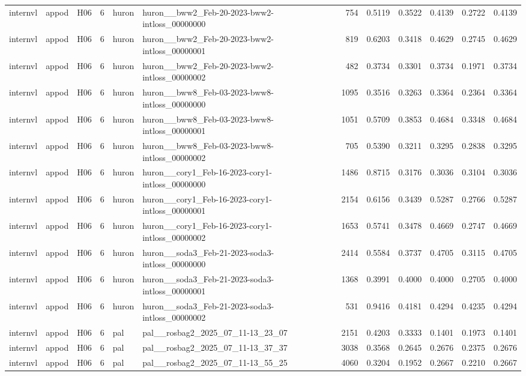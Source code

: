 \begin{table}[tbp]
\begin{tabular}{lllrllrrrrrr}
internvl & appod & H06 & 6 & huron & huron\_\_bww2\_Feb-20-2023-bww2-intloss\_00000000 & 754 & 0.5119 & 0.3522 & 0.4139 & 0.2722 & 0.4139 \\
internvl & appod & H06 & 6 & huron & huron\_\_bww2\_Feb-20-2023-bww2-intloss\_00000001 & 819 & 0.6203 & 0.3418 & 0.4629 & 0.2745 & 0.4629 \\
internvl & appod & H06 & 6 & huron & huron\_\_bww2\_Feb-20-2023-bww2-intloss\_00000002 & 482 & 0.3734 & 0.3301 & 0.3734 & 0.1971 & 0.3734 \\
internvl & appod & H06 & 6 & huron & huron\_\_bww8\_Feb-03-2023-bww8-intloss\_00000000 & 1095 & 0.3516 & 0.3263 & 0.3364 & 0.2364 & 0.3364 \\
internvl & appod & H06 & 6 & huron & huron\_\_bww8\_Feb-03-2023-bww8-intloss\_00000001 & 1051 & 0.5709 & 0.3853 & 0.4684 & 0.3348 & 0.4684 \\
internvl & appod & H06 & 6 & huron & huron\_\_bww8\_Feb-03-2023-bww8-intloss\_00000002 & 705 & 0.5390 & 0.3211 & 0.3295 & 0.2838 & 0.3295 \\
internvl & appod & H06 & 6 & huron & huron\_\_cory1\_Feb-16-2023-cory1-intloss\_00000000 & 1486 & 0.8715 & 0.3176 & 0.3036 & 0.3104 & 0.3036 \\
internvl & appod & H06 & 6 & huron & huron\_\_cory1\_Feb-16-2023-cory1-intloss\_00000001 & 2154 & 0.6156 & 0.3439 & 0.5287 & 0.2766 & 0.5287 \\
internvl & appod & H06 & 6 & huron & huron\_\_cory1\_Feb-16-2023-cory1-intloss\_00000002 & 1653 & 0.5741 & 0.3478 & 0.4669 & 0.2747 & 0.4669 \\
internvl & appod & H06 & 6 & huron & huron\_\_soda3\_Feb-21-2023-soda3-intloss\_00000000 & 2414 & 0.5584 & 0.3737 & 0.4705 & 0.3115 & 0.4705 \\
internvl & appod & H06 & 6 & huron & huron\_\_soda3\_Feb-21-2023-soda3-intloss\_00000001 & 1368 & 0.3991 & 0.4000 & 0.4000 & 0.2705 & 0.4000 \\
internvl & appod & H06 & 6 & huron & huron\_\_soda3\_Feb-21-2023-soda3-intloss\_00000002 & 531 & 0.9416 & 0.4181 & 0.4294 & 0.4235 & 0.4294 \\
internvl & appod & H06 & 6 & pal & pal\_\_rosbag2\_2025\_07\_11-13\_23\_07 & 2151 & 0.4203 & 0.3333 & 0.1401 & 0.1973 & 0.1401 \\
internvl & appod & H06 & 6 & pal & pal\_\_rosbag2\_2025\_07\_11-13\_37\_37 & 3038 & 0.3568 & 0.2645 & 0.2676 & 0.2375 & 0.2676 \\
internvl & appod & H06 & 6 & pal & pal\_\_rosbag2\_2025\_07\_11-13\_55\_25 & 4060 & 0.3204 & 0.1952 & 0.2667 & 0.2210 & 0.2667 \\

\end{tabular}
\end{table}
